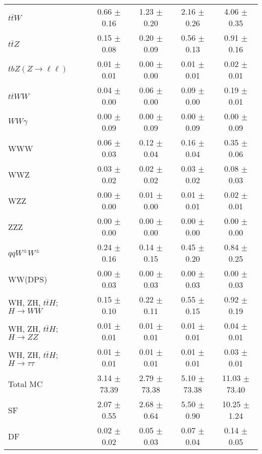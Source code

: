 \begin{tabular}{l|cccc}
                   $t\overline{t}W$ &  0.66 $\pm$  0.16 &  1.23 $\pm$  0.20 &  2.16 $\pm$  0.26 &  4.06 $\pm$  0.35 \\
                   $t\overline{t}Z$ &  0.15 $\pm$  0.08 &  0.20 $\pm$  0.09 &  0.56 $\pm$  0.13 &  0.91 $\pm$  0.16 \\
    $tbZ (Z \rightarrow \ell \ell)$ &  0.01 $\pm$  0.01 &  0.00 $\pm$  0.00 &  0.01 $\pm$  0.01 &  0.02 $\pm$  0.01 \\
                  $t\overline{t}WW$ &  0.04 $\pm$  0.00 &  0.06 $\pm$  0.00 &  0.09 $\pm$  0.00 &  0.19 $\pm$  0.01 \\
                         $WW\gamma$ &  0.00 $\pm$  0.09 &  0.00 $\pm$  0.09 &  0.00 $\pm$  0.09 &  0.00 $\pm$  0.09 \\
                                WWW &  0.06 $\pm$  0.03 &  0.12 $\pm$  0.04 &  0.16 $\pm$  0.04 &  0.35 $\pm$  0.06 \\
                                WWZ &  0.03 $\pm$  0.02 &  0.02 $\pm$  0.02 &  0.03 $\pm$  0.02 &  0.08 $\pm$  0.03 \\
                                WZZ &  0.00 $\pm$  0.00 &  0.01 $\pm$  0.00 &  0.01 $\pm$  0.01 &  0.02 $\pm$  0.01 \\
                                ZZZ &  0.00 $\pm$  0.00 &  0.00 $\pm$  0.00 &  0.00 $\pm$  0.00 &  0.00 $\pm$  0.00 \\
                 $qqW^{\pm}W^{\pm}$ &  0.24 $\pm$  0.16 &  0.14 $\pm$  0.15 &  0.45 $\pm$  0.20 &  0.84 $\pm$  0.25 \\
                            WW(DPS) &  0.00 $\pm$  0.03 &  0.00 $\pm$  0.03 &  0.00 $\pm$  0.03 &  0.00 $\pm$  0.03 \\
WH, ZH, $t\bar{t}H$; $H \rightarrow WW$ &  0.15 $\pm$  0.10 &  0.22 $\pm$  0.11 &  0.55 $\pm$  0.15 &  0.92 $\pm$  0.19 \\
WH, ZH, $t\bar{t}H$; $H \rightarrow ZZ$ &  0.01 $\pm$  0.01 &  0.01 $\pm$  0.01 &  0.01 $\pm$  0.01 &  0.04 $\pm$  0.01 \\
WH, ZH, $t\bar{t}H$; $H \rightarrow \tau\tau$ &  0.01 $\pm$  0.01 &  0.01 $\pm$  0.01 &  0.01 $\pm$  0.01 &  0.03 $\pm$  0.01 \\
\hline\hline
                           Total MC &  3.14 $\pm$ 73.39 &  2.79 $\pm$ 73.38 &  5.10 $\pm$ 73.38 & 11.03 $\pm$ 73.40 \\
\hline
                                 SF &  2.07 $\pm$  0.55 &  2.68 $\pm$  0.64 &  5.50 $\pm$  0.90 & 10.25 $\pm$  1.24 \\
                                 DF &  0.02 $\pm$  0.02 &  0.05 $\pm$  0.03 &  0.07 $\pm$  0.04 &  0.14 $\pm$  0.05 \\

\end{tabular}
